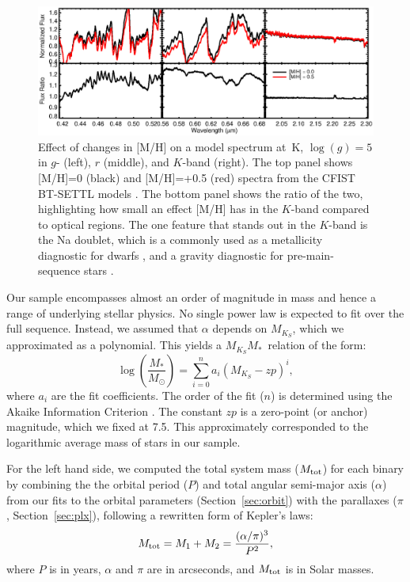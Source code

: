 \documentclass[twocolumn]{aastex62}
\newcommand{\mks}{$M_{K_S}$}
\newcommand{\mmk}{$M_{K_S}$\textendash$M_*$}
\begin{document}
\begin{figure}[htb]
\begin{center}
\includegraphics[width=\textwidth]{metallicity_effect.eps}
\caption{Effect of changes in [M/H] on a model spectrum at \,K, $\log(g)=5$ in $g$- (left), $r$ (middle), and $K$-band (right). The top panel shows [M/H]=0 (black) and [M/H]=+0.5 (red) spectra from the CFIST BT-SETTL models \citep{2012RSPTA.370.2765A}. The bottom panel shows the ratio of the two, highlighting how small an effect [M/H] has in the $K$-band compared to optical regions. The one feature that stands out in the $K$-band is the Na doublet, which is a commonly used as a metallicity diagnostic for dwarfs \citep{2010ApJ...720L.113R,Terrien:2012lr,Newton:2014}, and a gravity diagnostic for pre-main-sequence stars \citep[e.g.,][]{Schlieder2012}. }
\label{fig:metal}
\end{center}
\end{figure}

Our sample encompasses almost an order of magnitude in mass and hence a range of underlying stellar physics. No single power law is expected to fit over the full sequence. Instead, we assumed that $\alpha$ depends on \mks, which we approximated as a polynomial. This yields a \mmk\ relation of the form:
\begin{equation}\label{eqn:mmk}
\log \left( \frac{M_*}{M_\odot} \right) = \sum_{i=0}^{n} a_i(M_{K_S}-zp)^i,
\end{equation}
where $a_i$ are the fit coefficients. The order of the fit ($n$) is determined using the Akaike Information Criterion \citep[AIC, ][]{Akaike1974}. The constant $zp$ is a zero-point (or anchor) magnitude, which we fixed at 7.5. This approximately corresponded to the logarithmic average mass of stars in our sample. 

For the left hand side, we computed the total system mass ($M_{\rm{tot}}$) for each binary by combining the the orbital period ($P$) and total angular semi-major axis ($\alpha$) from our fits to the orbital parameters (Section~\ref{sec:orbit}) with the parallaxes ($\pi$, Section~\ref{sec:plx}), following a rewritten form of Kepler's laws:
\begin{equation}\label{eqn:mass}
M_{\rm{tot}} = M_{1}+M_{2} = \frac{(\alpha/\pi)^3}{P^2},
\end{equation}
where $P$ is in years, $\alpha$ and $\pi$ are in arcseconds, and $M_{\rm{tot}}$ is in Solar masses. 
\end{document}
